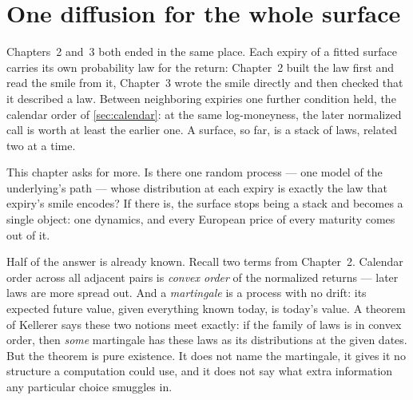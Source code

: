 \section{One diffusion for the whole surface}
\label{sec:lvfield}

Chapters~2 and~3 both ended in the same place.  Each expiry of a fitted
surface carries its own probability law for the return: Chapter~2 built
the law first and read the smile from it, Chapter~3 wrote the smile
directly and then checked that it described a law.  Between neighboring
expiries one further condition held, the calendar order of
\cref{sec:calendar}: at the same log-moneyness, the later normalized
call is worth at least the earlier one.  A surface, so far, is a stack
of laws, related two at a time.

This chapter asks for more.  Is there one random process --- one model
of the underlying's path --- whose distribution at each expiry is
exactly the law that expiry's smile encodes?  If there is, the surface
stops being a stack and becomes a single object: one dynamics, and
every European price of every maturity comes out of it.

Half of the answer is already known.  Recall two terms from Chapter~2.
Calendar order across all adjacent pairs is \emph{convex order} of the
normalized returns --- later laws are more spread out.  And a
\emph{martingale} is a process with no drift: its expected future
value, given everything known today, is today's value.  A theorem of
Kellerer \citep{Kellerer1972} says these two notions meet exactly: if
the family of laws is in convex order, then \emph{some} martingale has
these laws as its distributions at the given dates.  But the theorem is
pure existence.  It does not name the martingale, it gives it no
structure a computation could use, and it does not say what extra
information any particular choice smuggles in.

